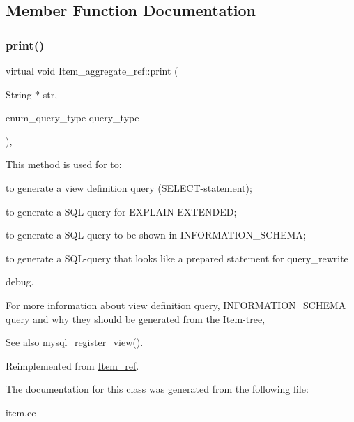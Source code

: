 \subsection{Member Function Documentation}
\mbox{\label{classItem__aggregate__ref_ae6a411b0088c79b64443138fcc3625ba}} 
\subsubsection{\texorpdfstring{print()}{print()}}
{\footnotesize\ttfamily virtual void Item\+\_\+aggregate\+\_\+ref\+::print (\begin{DoxyParamCaption}\item[{String $\ast$}]{str,  }\item[{enum\+\_\+query\+\_\+type}]{query\+\_\+type }\end{DoxyParamCaption})\hspace{0.3cm}{\ttfamily [inline]}, {\ttfamily [virtual]}}

This method is used for to\+:
\begin{DoxyItemize}
\item to generate a view definition query (S\+E\+L\+E\+CT-\/statement);
\item to generate a S\+QL-\/query for E\+X\+P\+L\+A\+IN E\+X\+T\+E\+N\+D\+ED;
\item to generate a S\+QL-\/query to be shown in I\+N\+F\+O\+R\+M\+A\+T\+I\+O\+N\+\_\+\+S\+C\+H\+E\+MA;
\item to generate a S\+QL-\/query that looks like a prepared statement for query\+\_\+rewrite
\item debug.
\end{DoxyItemize}

For more information about view definition query, I\+N\+F\+O\+R\+M\+A\+T\+I\+O\+N\+\_\+\+S\+C\+H\+E\+MA query and why they should be generated from the \mbox{\hyperlink{classItem}{Item}}-\/tree, \begin{DoxySeeAlso}{See also}
mysql\+\_\+register\+\_\+view(). 
\end{DoxySeeAlso}


Reimplemented from \mbox{\hyperlink{classItem__ref_a90c0289e8983ca73c75eaa92bc762cf6}{Item\+\_\+ref}}.



The documentation for this class was generated from the following file\+:\begin{DoxyCompactItemize}
\item 
item.\+cc\end{DoxyCompactItemize}

